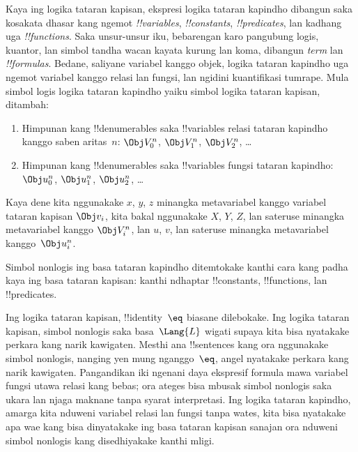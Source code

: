 \documentclass[../../../include/open-logic-section]{subfiles}
\begin{document}


Kaya ing logika tataran kapisan, ekspresi logika tataran kapindho
dibangun saka kosakata dhasar kang ngemot \emph{!!{variable}s},
\emph{!!{constant}s}, \emph{!!{predicate}s}, lan kadhang uga
\emph{!!{function}s}. Saka unsur-unsur iku, bebarengan karo
pangubung logis, kuantor, lan simbol tandha wacan kayata
kurung lan koma, dibangun \emph{term} lan \emph{!!{formula}s}.
Bedane, saliyane variabel kanggo objek, logika tataran kapindho
uga ngemot variabel kanggo relasi lan fungsi, lan ngidini
kuantifikasi tumrape. Mula simbol logis logika tataran kapindho
yaiku simbol logika tataran kapisan, ditambah:

\begin{enumerate}
\item Himpunan kang !!{denumerable}s saka !!{variable}s relasi
  tataran kapindho kanggo saben aritas~$n$: $\Obj V_0^n$,
  $\Obj V_1^n$, $\Obj V_2^n$, \dots
\item Himpunan kang !!{denumerable}s saka !!{variable}s fungsi
  tataran kapindho:
  $\Obj u_0^n$, $\Obj u_1^n$, $\Obj u_2^n$, \dots
\end{enumerate}

Kaya dene kita nggunakake $x$, $y$, $z$ minangka metavariabel
kanggo variabel tataran kapisan $\Obj v_i$, kita bakal nggunakake
$X$, $Y$, $Z$, lan sateruse minangka metavariabel kanggo
$\Obj V_i^n$, lan $u$, $v$, lan sateruse minangka metavariabel
kanggo~$\Obj u_i^n$.

\begin{explain}
Simbol nonlogis ing basa tataran kapindho ditemtokake kanthi cara
kang padha kaya ing basa tataran kapisan: kanthi ndhaptar
!!{constant}s, !!{function}s, lan !!{predicate}s.

Ing logika tataran kapisan, !!{identity}~$\eq$ biasane dilebokake.
Ing logika tataran kapisan, simbol nonlogis saka basa~$\Lang{L}$
wigati supaya kita bisa nyatakake perkara kang narik kawigaten.
Mesthi ana !!{sentence}s kang ora nggunakake simbol nonlogis,
nanging yen mung nganggo~$\eq$, angel nyatakake perkara kang
narik kawigaten. Pangandikan iki ngenani daya ekspresif formula mawa variabel fungsi utawa relasi kang bebas; ora ateges bisa mbusak simbol nonlogis saka ukara lan njaga maknane tanpa syarat interpretasi. Ing logika tataran kapindho, amarga kita nduweni
variabel relasi lan fungsi tanpa wates, kita bisa nyatakake
apa wae kang bisa dinyatakake ing basa tataran kapisan sanajan ora
nduweni simbol nonlogis kang disedhiyakake kanthi mligi.
\end{explain}
\end{document}
